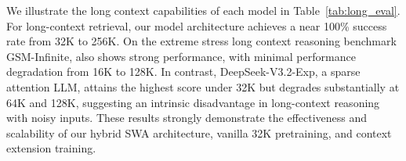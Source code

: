 

We illustrate the long context capabilities of each model in Table~\ref{tab:long_eval}.
For long-context retrieval, our model architecture achieves a near 100\% success rate from 32K to 256K.
On the extreme stress long context reasoning benchmark GSM-Infinite, \mimoflash{} also shows strong performance, with minimal performance degradation from 16K to 128K.
In contrast, DeepSeek-V3.2-Exp, a sparse attention LLM, attains the highest score under 32K but degrades substantially at 64K and 128K, suggesting an intrinsic disadvantage in long-context reasoning with noisy inputs.
These results strongly demonstrate the effectiveness and scalability of our hybrid SWA architecture, vanilla 32K pretraining, and context extension training.



